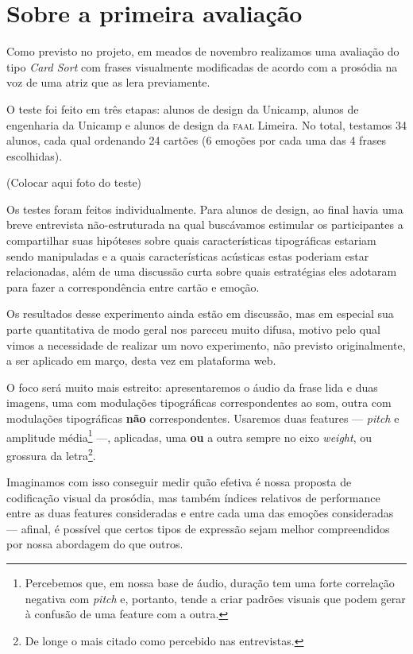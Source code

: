 \documentclass[a4paper,11pt,titlepage,singlespacing]{article}
\begin{document}
{\color{pos_parecer}

    \section{Sobre a primeira avaliação}

    Como previsto no projeto, em meados de novembro realizamos uma avaliação do tipo \textit{Card Sort} com frases visualmente modificadas de acordo com a prosódia na voz de uma atriz que as lera previamente. 
    
    O teste foi feito em três etapas: alunos de design da Unicamp, alunos de engenharia da Unicamp e alunos de design da \textsc{faal} Limeira. No total, testamos 34 alunos, cada qual ordenando 24 cartões (6 emoções por cada uma das 4 frases escolhidas).
    
    (Colocar aqui foto do teste)
    
    Os testes foram feitos individualmente. Para alunos de design, ao final havia uma breve entrevista não-estruturada na qual buscávamos estimular os participantes a compartilhar suas hipóteses sobre quais características tipográficas estariam sendo manipuladas e a quais características acústicas estas poderiam estar relacionadas, além de uma discussão curta sobre quais estratégias eles adotaram para fazer a correspondência entre cartão e emoção.
    
    Os resultados desse experimento ainda estão em discussão, mas em especial sua parte quantitativa de modo geral nos pareceu muito difusa, motivo pelo qual vimos a necessidade de realizar um novo experimento, não previsto originalmente, a ser aplicado em março, desta vez em plataforma web. 
    
    O foco será muito mais estreito: apresentaremos o áudio da frase lida e duas imagens, uma com modulações tipográficas correspondentes ao som, outra com modulações tipográficas \textbf{não} correspondentes. Usaremos duas features — \textit{pitch} e amplitude média\footnote{Percebemos que, em nossa base de áudio, duração tem uma forte correlação negativa com \textit{pitch} e, portanto, tende a criar padrões visuais que podem gerar à confusão de uma feature com a outra.} —, aplicadas, uma \textbf{ou} a outra sempre no eixo \textit{weight}, ou grossura da letra\footnote{De longe o mais citado como percebido nas entrevistas.}. 
    
    Imaginamos com isso conseguir medir quão efetiva é nossa proposta de codificação visual da prosódia, mas também índices relativos de performance entre as duas features consideradas e entre cada uma das emoções consideradas — afinal, é possível que certos tipos de expressão sejam melhor compreendidos por nossa abordagem do que outros.
    
}
\end{document}
